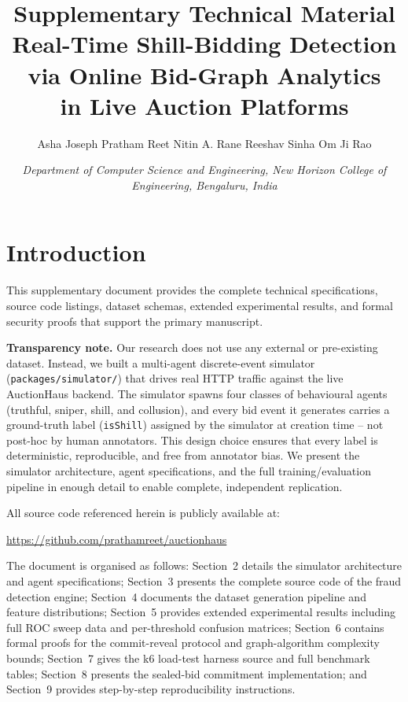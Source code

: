 \documentclass[11pt]{article}
\title{\textbf{Supplementary Technical Material}\\[6pt]
\large Real-Time Shill-Bidding Detection via Online Bid-Graph Analytics\\in Live Auction Platforms}
\author{Asha Joseph \quad Pratham Reet \quad Nitin A. Rane \quad Reeshav Sinha \quad Om Ji Rao}
\date{\textit{Department of Computer Science and Engineering, New Horizon College of Engineering, Bengaluru, India}}
\begin{document}
\maketitle

\tableofcontents
\newpage

\section{Introduction}

This supplementary document provides the complete technical specifications,
source code listings, dataset schemas, extended experimental results, and
formal security proofs that support the primary manuscript.

\textbf{Transparency note.} Our research does not use any external or
pre-existing dataset. Instead, we built a multi-agent discrete-event
simulator (\texttt{packages/simulator/}) that drives real HTTP traffic
against the live AuctionHaus backend. The simulator spawns four classes of
behavioural agents (truthful, sniper, shill, and collusion), and every bid
event it generates carries a ground-truth label (\texttt{isShill}) assigned
by the simulator at creation time -- not post-hoc by human annotators.
This design choice ensures that every label is deterministic, reproducible,
and free from annotator bias. We present the simulator architecture,
agent specifications, and the full training/evaluation pipeline in enough
detail to enable complete, independent replication.

All source code referenced herein is publicly available at:
\begin{center}
\url{https://github.com/prathamreet/auctionhaus}
\end{center}

The document is organised as follows: Section~2 details the simulator
architecture and agent specifications; Section~3 presents the complete
source code of the fraud detection engine; Section~4 documents the
dataset generation pipeline and feature distributions; Section~5 provides
extended experimental results including full ROC sweep data and per-threshold
confusion matrices; Section~6 contains formal proofs for the commit-reveal
protocol and graph-algorithm complexity bounds; Section~7 gives the
k6 load-test harness source and full benchmark tables; Section~8 presents
the sealed-bid commitment implementation; and Section~9 provides step-by-step
reproducibility instructions.
\end{document}
